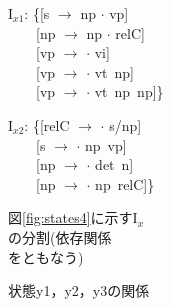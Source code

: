 \begin{figure}[htbp]
  \begin{center}
  \begin{minipage}[b]{\mpw}
    \begin{center}
       {\small
        \begin{minipage}[t]{\mpw}
          I$_{x1}$: \{[s $\to$ np $\cdot$ vp] \\ 
          　　[np $\to$ np $\cdot$ relC] \\
          　　[vp $\to$ $\cdot$ vi] \\ 
          　　[vp $\to$ $\cdot$ vt\ np] \\
          　　[vp $\to$ $\cdot$ vt\ np\ np]\}
          
          \vspace{\vs}
          I$_{x2}$: \{[relC $\to$ $\cdot$ s/np] \\
          　　[s $\to$ $\cdot$ np\ vp] \\ 
          　　[np $\to$ $\cdot$ det\ n] \\
          　　[np $\to$ $\cdot$ np\ relC]\}
        \end{minipage}
        }
      \caption{図\ref{fig:states4}に示すI$_{x}$\\の分割(依存関係\\をともなう)}
      \label{fig:states5}
    \end{center}
  \end{minipage}
  \hspace{1cm}
  \begin{minipage}[b]{6cm}
    \begin{center}
      
      \caption{状態y1，y2，y3の関係\\}
      \label{fig:depend}
    \end{center}
  \end{minipage}
  \end{center}
\end{figure}

